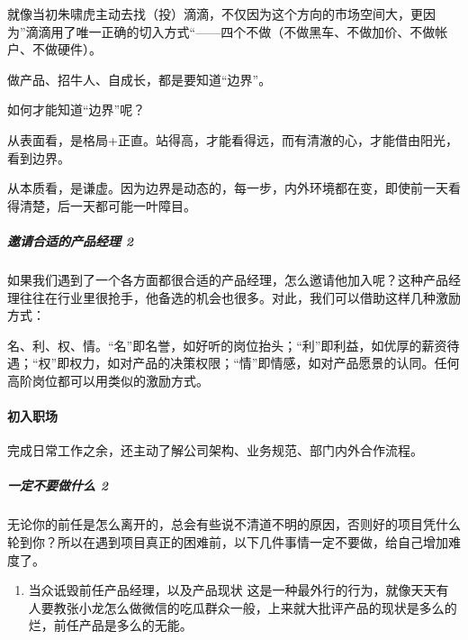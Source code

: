 \documentclass[letterpaper,10pt,english]{sphinxmanual}
\begin{document}
就像当初朱啸虎主动去找（投）滴滴，不仅因为这个方向的市场空间大，更因为”滴滴用了唯一正确的切入方式“——四个不做（不做黑车、不做加价、不做帐户、不做硬件）。

做产品、招牛人、自成长，都是要知道“边界”。

如何才能知道“边界”呢？

从表面看，是格局+正直。站得高，才能看得远，而有清澈的心，才能借由阳光，看到边界。

从本质看，是谦虚。因为边界是动态的，每一步，内外环境都在变，即使前一天看得清楚，后一天都可能一叶障目。


\subparagraph{邀请合适的产品经理 2\sphinxfootnotemark[899]}
\label{\detokenize{chapter_interview/hire:id2}}%
\begin{footnotetext}[899]\sphinxAtStartFootnote
{}
%
\end{footnotetext}\ignorespaces 
如果我们遇到了一个各方面都很合适的产品经理，怎么邀请他加入呢？这种产品经理往往在行业里很抢手，他备选的机会也很多。对此，我们可以借助这样几种激励方式：

名、利、权、情。“名”即名誉，如好听的岗位抬头；“利”即利益，如优厚的薪资待遇；“权”即权力，如对产品的决策权限；“情”即情感，如对产品愿景的认同。任何高阶岗位都可以用类似的激励方式。


\paragraph{初入职场}
\label{\detokenize{chapter_interview/enter:id1}}\label{\detokenize{chapter_interview/enter::doc}}
完成日常工作之余，还主动了解公司架构、业务规范、部门内外合作流程。%
\begin{footnote}[900]\sphinxAtStartFootnote
{}
%
\end{footnote}


\subparagraph{一定不要做什么 2\sphinxfootnotemark[901]}
\label{\detokenize{chapter_interview/enter:id2}}%
\begin{footnotetext}[901]\sphinxAtStartFootnote
{}
%
\end{footnotetext}\ignorespaces 
无论你的前任是怎么离开的，总会有些说不清道不明的原因，否则好的项目凭什么轮到你？所以在遇到项目真正的困难前，以下几件事情一定不要做，给自己增加难度了。
\begin{enumerate}
%
\item {} 
当众诋毁前任产品经理，以及产品现状
这是一种最外行的行为，就像天天有人要教张小龙怎么做微信的吃瓜群众一般，上来就大批评产品的现状是多么的烂，前任产品是多么的无能。

\end{enumerate}
\end{document}
